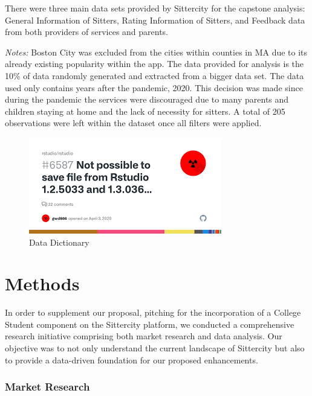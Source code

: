 \documentclass[12pt]{article}
\begin{document}
There were three main data sets provided by Sittercity for the capstone
analysis: General Information of Sitters, Rating Information of Sitters,
and Feedback data from both providers of services and parents.

\emph{Notes:} Boston City was excluded from the cities within counties
in MA due to its already existing popularity within the app. The data
provided for analysis is the 10\% of data randomly generated and
extracted from a bigger data set. The data used only contains years
after the pandemic, 2020. This decision was made since during the
pandemic the services were discouraged due to many parents and children
staying at home and the lack of necessity for sitters. A total of 205
observations were left within the dataset once all filters were applied.

\begin{figure}
\centering
\includegraphics{images/example.png}
\caption{Data Dictionary}
\end{figure}

\hypertarget{methods}{%
\section{Methods}\label{methods}}

In order to supplement our proposal, pitching for the incorporation of a
College Student component on the Sittercity platform, we conducted a
comprehensive research initiative comprising both market research and
data analysis. Our objective was to not only understand the current
landscape of Sittercity but also to provide a data-driven foundation for
our proposed enhancements.

\hypertarget{market-research}{%
\subsubsection{Market Research}\label{market-research}}
\end{document}
